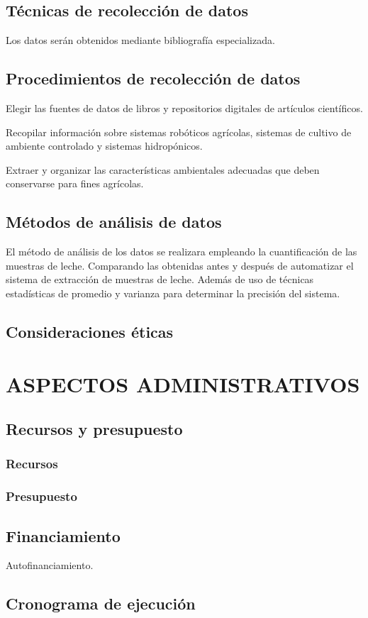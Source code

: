 \documentclass{report}
\begin{document}
\section{Técnicas de recolección de datos}
Los datos serán obtenidos mediante bibliografía especializada.
\section{Procedimientos de recolección de datos}
Elegir las fuentes de datos de libros y repositorios digitales de artículos
científicos.

Recopilar información sobre sistemas robóticos agrícolas, sistemas de cultivo de
ambiente controlado y sistemas hidropónicos.

Extraer y organizar las características ambientales adecuadas que deben
conservarse para fines agrícolas.
\section{Métodos de análisis de datos}
El método de análisis de los datos se realizara empleando la cuantificación de las muestras de leche. Comparando las obtenidas antes y después de automatizar el sistema de extracción de muestras de leche. Además de uso de técnicas estadísticas de promedio y varianza para determinar la precisión del sistema.
\section{Consideraciones éticas}

\chapter{ASPECTOS ADMINISTRATIVOS}
\section{Recursos y presupuesto}
\subsection{Recursos}
\subsection{Presupuesto}
\section{Financiamiento}
Autofinanciamiento.
\section{Cronograma de ejecución}
\end{document}
